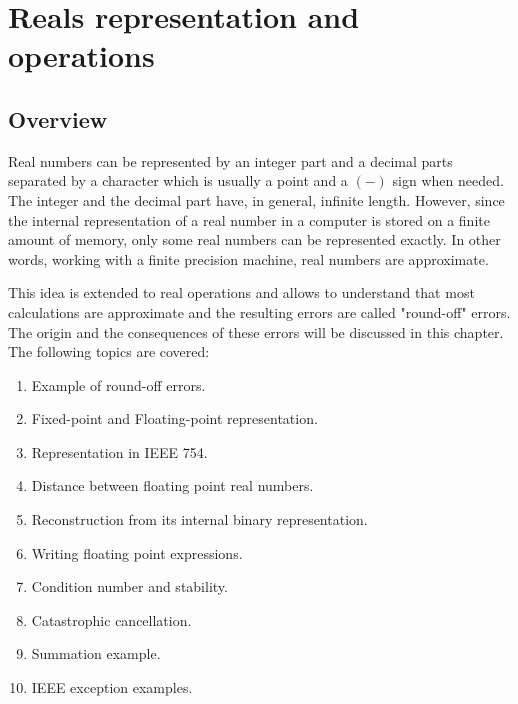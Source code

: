 %        




\chapter{Reals representation and operations} \label{chap:reals}


    \section*{Overview}

Real numbers can be represented by 
an integer part and a decimal parts separated by a character which is usually a point 
and a $(-)$ sign when needed. 
The integer and the decimal part have, in general, infinite length.  
However, since the internal representation of a real number 
in a computer  is stored on a finite amount of memory, 
only some real numbers can be represented exactly. 
In other words, working with a finite precision machine, real numbers are approximate.

This idea is extended to real operations and allows to understand that most calculations 
are approximate and the resulting errors are called "round-off" errors. 
The origin and the consequences of these errors will be discussed in this chapter. 
The following topics are covered: 

\begin{enumerate} 
    \setlength\itemsep{-0.1cm}
    \item Example of round-off errors. 
    \item Fixed-point and Floating-point representation.
    \item Representation in IEEE 754.
    \item Distance between floating point real numbers.
    \item Reconstruction from its internal binary representation.
    \item Writing floating point expressions.
    \item Condition number and stability.
    \item Catastrophic cancellation.
    \item Summation example.
    \item IEEE exception examples.
\end{enumerate} 

